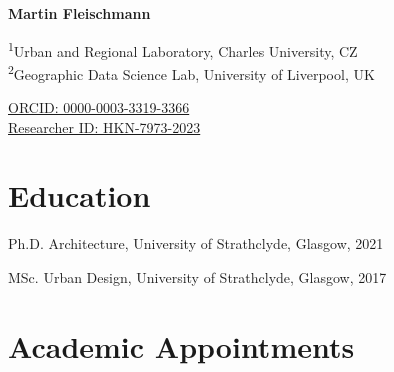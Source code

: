 \documentclass[11pt,a4paper]{report}
\newcommand{\myname}{Martin Fleischmann}
\newcommand{\namefont}[1]{{\normalfont\bfseries\Huge{#1}}}
\begin{document}
    \raggedright{}

    \namefont{\myname}

    \vspace{1em}

    \begin{minipage}[t]{0.6\textwidth}
        \begin{flushleft}
            \textsuperscript{1}Urban and Regional Laboratory, Charles University, CZ \\
            \textsuperscript{2}Geographic Data Science Lab, University of Liverpool, UK \\
        \end{flushleft}
    \end{minipage}%
    \begin{minipage}[t]{0.4\textwidth}
        \begin{flushright}
            \href{https://orcid.org/0000-0003-3319-3366}{ORCID: 0000-0003-3319-3366} \\
            \href{https://www.webofscience.com/wos/author/record/HKN-7973-2023}{Researcher ID: HKN-7973-2023}
        \end{flushright}
    \end{minipage}%


    \section*{Education}

    \begin{tablist}

        \item[Ph.D.] \tab{}Architecture, University of Strathclyde, Glasgow, 2021 \\
        \item[MSc.]  \tab{}Urban Design, University of Strathclyde, Glasgow, 2017 \\

    \end{tablist}


    \section*{Academic Appointments}
\end{document}
